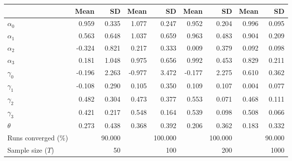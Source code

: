 
\begin{tabular}[t]{lrrrrrrrr}
\toprule
  & Mean & SD & Mean  & SD  & Mean   & SD   & Mean    & SD   \\
\midrule
$\alpha_{0}$ & 0.959 & 0.335 & 1.077 & 0.247 & 0.952 & 0.204 & 0.996 & 0.095\\
$\alpha_{1}$ & 0.563 & 0.648 & 1.037 & 0.659 & 0.963 & 0.483 & 0.904 & 0.209\\
$\alpha_{2}$ & -0.324 & 0.821 & 0.217 & 0.333 & 0.009 & 0.379 & 0.092 & 0.098\\
$\alpha_{3}$ & 0.181 & 1.048 & 0.975 & 0.656 & 0.992 & 0.453 & 0.829 & 0.211\\
$\gamma_{0}$ & -0.196 & 2.263 & -0.977 & 3.472 & -0.177 & 2.275 & 0.610 & 0.362\\
$\gamma_{1}$ & -0.108 & 0.290 & 0.105 & 0.350 & 0.109 & 0.107 & 0.004 & 0.077\\
$\gamma_{2}$ & 0.482 & 0.304 & 0.473 & 0.377 & 0.553 & 0.071 & 0.468 & 0.111\\
$\gamma_{3}$ & 0.421 & 0.217 & 0.548 & 0.164 & 0.539 & 0.098 & 0.508 & 0.066\\
$\theta$ & 0.273 & 0.438 & 0.368 & 0.392 & 0.206 & 0.362 & 0.183 & 0.332\\
Runs converged (\%) &  & 90.000 &  & 100.000 &  & 100.000 &  & 90.000\\
Sample size ($T$) &  & 50 &  & 100 &  & 200 &  & 1000\\
\bottomrule
\end{tabular}

